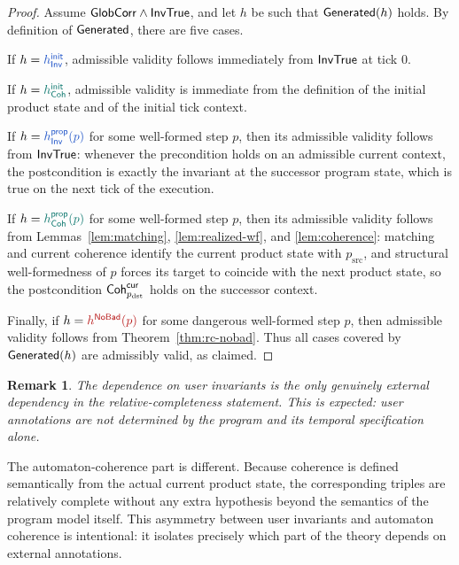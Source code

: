 \documentclass[acmsmall,screen]{acmart}
\theoremstyle{leftplain}
\theoremstyle{leftdefinition}
\theoremstyle{leftremark}
\newtheorem{remark}[theorem]{Remark}
\begin{document}
\begin{proof}
Assume $\mathsf{GlobCorr} \wedge \mathsf{InvTrue}$, and let $h$ be such that $\mathsf{Generated}(h)$
holds. By definition of $\mathsf{Generated}$, there are five cases.

If $h = \tripleinv{h^{\mathsf{init}}_{\NodeInv}}$, admissible validity follows
immediately from $\mathsf{InvTrue}$ at tick $0$.

If $h = \triplecoh{h^{\mathsf{init}}_{\Coherence}}$, admissible validity is
immediate from the definition of the initial product state and of the initial
tick context.

If $h = \tripleinv{h^{\mathsf{prop}}_{\NodeInv}(p)}$ for some well-formed step $p$, then
its admissible validity follows from $\mathsf{InvTrue}$: whenever the precondition
holds on an admissible current context, the postcondition is exactly the
invariant at the successor program state, which is true on the next tick of
the execution.

If $h = \triplecoh{h^{\mathsf{prop}}_{\Coherence}(p)}$ for some well-formed step $p$, then
its admissible validity follows from Lemmas~\ref{lem:matching},
\ref{lem:realized-wf}, and \ref{lem:coherence}: matching and current coherence
identify the current product state with $p_{\mathrm{src}}$, and structural
well-formedness of $p$ forces its target to coincide with the next product
state, so the postcondition $\mathsf{Coh}^{\mathsf{cur}}_{p_{\mathrm{dst}}}$ holds on the
successor context.

Finally, if $h = \triplesafe{h^{\NoBad}(p)}$ for some dangerous well-formed step $p$, then
admissible validity follows from Theorem~\ref{thm:rc-nobad}. Thus all cases
covered by $\mathsf{Generated}(h)$ are admissibly valid, as claimed.
\end{proof}

\begin{remark}
The dependence on user invariants is the only genuinely external dependency in
the relative-completeness statement. This is expected: user annotations are not
determined by the program and its temporal specification alone.
\end{remark}

The automaton-coherence part is different. Because coherence is defined
semantically from the actual current product state, the corresponding triples
are relatively complete without any extra hypothesis beyond the semantics of
the program model itself.
This asymmetry between user invariants and automaton coherence is intentional:
it isolates precisely which part of the theory depends on external annotations.
\end{document}
